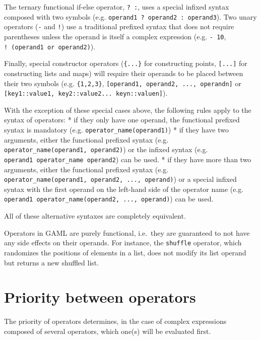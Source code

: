 \documentclass[]{book}
\theoremstyle{definition}
\theoremstyle{definition}
\theoremstyle{definition}
\theoremstyle{remark}
\begin{document}
The ternary functional if-else operator, \texttt{?\ :}, uses a special
infixed syntax composed with two symbols (e.g.
\texttt{operand1\ ?\ operand2\ :\ operand3}). Two unary operators
(\texttt{-} and \texttt{!}) use a traditional prefixed syntax that does
not require parentheses unless the operand is itself a complex
expression (e.g. \texttt{-\ 10}, \texttt{!\ (operand1\ or\ operand2)}).

Finally, special constructor operators (\texttt{\{...\}} for
constructing points, \texttt{{[}...{]}} for constructing lists and maps)
will require their operands to be placed between their two symbols (e.g.
\texttt{\{1,2,3\}}, \texttt{{[}operand1,\ operand2,\ ...,\ operandn{]}}
or \texttt{{[}key1::value1,\ key2::value2...\ keyn::valuen{]}}).

With the exception of these special cases above, the following rules
apply to the syntax of operators: * if they only have one operand, the
functional prefixed syntax is mandatory (e.g.
\texttt{operator\_name(operand1)}) * if they have two arguments, either
the functional prefixed syntax (e.g.
\texttt{operator\_name(operand1,\ operand2)}) or the infixed syntax
(e.g. \texttt{operand1\ operator\_name\ operand2}) can be used. * if
they have more than two arguments, either the functional prefixed syntax
(e.g. \texttt{operator\_name(operand1,\ operand2,\ ...,\ operand)}) or a
special infixed syntax with the first operand on the left-hand side of
the operator name (e.g.
\texttt{operand1\ operator\_name(operand2,\ ...,\ operand)}) can be
used.

All of these alternative syntaxes are completely equivalent.

Operators in GAML are purely functional, i.e.~they are guaranteed to not
have any side effects on their operands. For instance, the
\texttt{shuffle} operator, which randomizes the positions of elements in
a list, does not modify its list operand but returns a new shuffled
list.

\section{\texorpdfstring{}{ }}\label{section}

\section{Priority between operators}\label{priority-between-operators}

The priority of operators determines, in the case of complex expressions
composed of several operators, which one(s) will be evaluated first.
\end{document}
